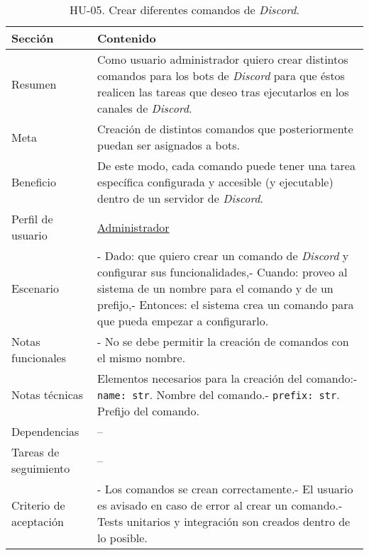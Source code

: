 \begin{table}[H]
    \centering
    \def\arraystretch{1.25}
    \begin{adjustbox}{max width=\textwidth}
    \begin{tabularx}{\textwidth}{l|L}
    \hline
        \textbf{Sección} & \textbf{Contenido} \\ \hline
    \hline
        Resumen & Como usuario administrador quiero crear distintos comandos para los bots de \textit{Discord} para que éstos realicen las tareas que deseo tras ejecutarlos en los canales de \textit{Discord}. \\ \hline
        Meta & Creación de distintos comandos que posteriormente puedan ser asignados a bots. \\ \hline
        Beneficio & De este modo, cada comando puede tener una tarea específica configurada y accesible (y ejecutable) dentro de un servidor de \textit{Discord}. \\ \hline
        Perfil de usuario & \hyperref[sec:personaAdmin]{Administrador} \\ \hline
        Escenario & - Dado: que quiero crear un comando de \textit{Discord} y configurar sus funcionalidades,\linebreak - Cuando: proveo al sistema de un nombre para el comando y de un prefijo,\linebreak - Entonces: el sistema crea un comando para que pueda empezar a configurarlo. \\ \hline
        Notas funcionales & - No se debe permitir la creación de comandos con el mismo nombre. \\ \hline
        Notas técnicas & Elementos necesarios para la creación del comando:\linebreak - \verb|name: str|. Nombre del comando.\linebreak - \verb|prefix: str|. Prefijo del comando. \\ \hline
        Dependencias & – \\ \hline
        Tareas de seguimiento & – \\ \hline
        Criterio de aceptación & - Los comandos se crean correctamente.\linebreak - El usuario es avisado en caso de error al crear un comando.\linebreak - Tests unitarios y integración son creados dentro de lo posible. \\ \hline
    \end{tabularx}
    \end{adjustbox}
    \caption{HU-05. Crear diferentes comandos de \textit{Discord}.}
\end{table}


